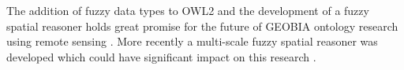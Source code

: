 \documentclass[authoryear, review,12pt,number]{elsarticle}
\begin{document}

The addition of fuzzy
data types to OWL2 and the development of a fuzzy spatial reasoner holds great
promise for the future of GEOBIA ontology research using remote sensing
\citep{Bobillo2011, Bobillo2015}. More recently a multi-scale fuzzy spatial
reasoner was developed which could have significant impact on this research
\citep{Argyridis2015}.
\end{document}
